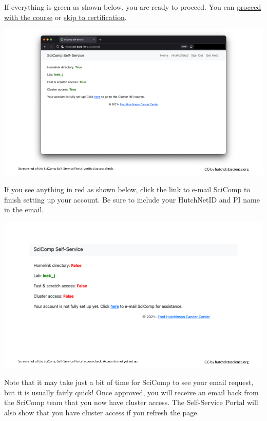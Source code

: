 \documentclass[
]{book}
\begin{document}
If everything is green as shown below, you are ready to proceed. You can \protect\hyperlink{terminal}{proceed with the course} or \protect\hyperlink{skip-to-certification}{skip to certification}.

\includegraphics[width=1\linewidth]{resources/images/02-accounts_files/figure-latex//1BQxrVYdKZTbpCaF-i_q9w7s9x034lEXpQZDU-Sl09cs_g166d4f31b2e_0_5}

If you see anything in red as shown below, click the link to e-mail SciComp to finish setting up your account. Be sure to include your HutchNetID and PI name in the email.

\includegraphics[width=1\linewidth]{resources/images/02-accounts_files/figure-latex//1BQxrVYdKZTbpCaF-i_q9w7s9x034lEXpQZDU-Sl09cs_g166d4f31b2e_0_10}

Note that it may take just a bit of time for SciComp to see your email request, but it is usually fairly quick! Once approved, you will receive an email back from the SciComp team that you now have cluster access. The Self-Service Portal will also show that you have cluster access if you refresh the page.
\end{document}
